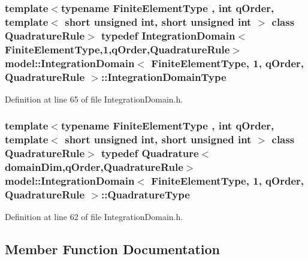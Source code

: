 \subsubsection[{Integration\+Domain\+Type}]{\setlength{\rightskip}{0pt plus 5cm}template$<$typename Finite\+Element\+Type , int q\+Order, template$<$ short unsigned int, short unsigned int $>$ class Quadrature\+Rule$>$ typedef {\bf Integration\+Domain}$<$Finite\+Element\+Type,1,q\+Order,Quadrature\+Rule$>$ {\bf model\+::\+Integration\+Domain}$<$ Finite\+Element\+Type, 1, q\+Order, Quadrature\+Rule $>$\+::{\bf Integration\+Domain\+Type}}\label{structmodel_1_1_integration_domain_3_01_finite_element_type_00_011_00_01q_order_00_01_quadrature_rule_01_4_a7873d1cffeaa8a8dde260fefa1827dbd}


Definition at line 65 of file Integration\+Domain.\+h.

\hypertarget{structmodel_1_1_integration_domain_3_01_finite_element_type_00_011_00_01q_order_00_01_quadrature_rule_01_4_a057154318f491aae67780b638d79e0b6}{}
\subsubsection[{Quadrature\+Type}]{\setlength{\rightskip}{0pt plus 5cm}template$<$typename Finite\+Element\+Type , int q\+Order, template$<$ short unsigned int, short unsigned int $>$ class Quadrature\+Rule$>$ typedef {\bf Quadrature}$<${\bf domain\+Dim},q\+Order,Quadrature\+Rule$>$ {\bf model\+::\+Integration\+Domain}$<$ Finite\+Element\+Type, 1, q\+Order, Quadrature\+Rule $>$\+::{\bf Quadrature\+Type}}\label{structmodel_1_1_integration_domain_3_01_finite_element_type_00_011_00_01q_order_00_01_quadrature_rule_01_4_a057154318f491aae67780b638d79e0b6}


Definition at line 62 of file Integration\+Domain.\+h.



\subsection{Member Function Documentation}
\hypertarget{structmodel_1_1_integration_domain_3_01_finite_element_type_00_011_00_01q_order_00_01_quadrature_rule_01_4_a74fb0fe8cdd3332d16dfd9e9d603642e}{}
